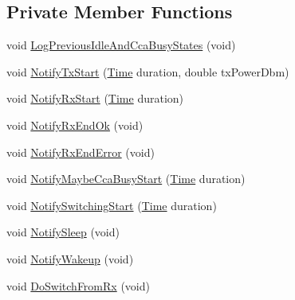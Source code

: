 \subsection*{Private Member Functions}
\begin{DoxyCompactItemize}
\item 
void \hyperlink{classns3_1_1WifiPhyStateHelper_a7ae77c9b82ad9d8607e7ff1165272b66}{Log\+Previous\+Idle\+And\+Cca\+Busy\+States} (void)
\item 
void \hyperlink{classns3_1_1WifiPhyStateHelper_ac3e02265e29155f65ae23223ca52f7d5}{Notify\+Tx\+Start} (\hyperlink{classns3_1_1Time}{Time} duration, double tx\+Power\+Dbm)
\item 
void \hyperlink{classns3_1_1WifiPhyStateHelper_a4bc928934cd4eb9799ed154a59b9c589}{Notify\+Rx\+Start} (\hyperlink{classns3_1_1Time}{Time} duration)
\item 
void \hyperlink{classns3_1_1WifiPhyStateHelper_a4ce5e0378410e43323157bfedc917512}{Notify\+Rx\+End\+Ok} (void)
\item 
void \hyperlink{classns3_1_1WifiPhyStateHelper_ae5344608e5beade36e11add8562f7421}{Notify\+Rx\+End\+Error} (void)
\item 
void \hyperlink{classns3_1_1WifiPhyStateHelper_af7d8d1f8e6a3e3874939f8b523e3dd5a}{Notify\+Maybe\+Cca\+Busy\+Start} (\hyperlink{classns3_1_1Time}{Time} duration)
\item 
void \hyperlink{classns3_1_1WifiPhyStateHelper_a3e06cad056055b4b2a092569c3071113}{Notify\+Switching\+Start} (\hyperlink{classns3_1_1Time}{Time} duration)
\item 
void \hyperlink{classns3_1_1WifiPhyStateHelper_af22dcfe78bc86f17a20ce4691d066085}{Notify\+Sleep} (void)
\item 
void \hyperlink{classns3_1_1WifiPhyStateHelper_af406f276b6d8f66bafe371845483e0e8}{Notify\+Wakeup} (void)
\item 
void \hyperlink{classns3_1_1WifiPhyStateHelper_a1f57e08c21efb84c6a34a832c19966d8}{Do\+Switch\+From\+Rx} (void)
\end{DoxyCompactItemize}
